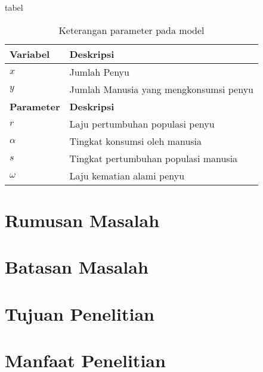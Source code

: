 tabel
\begin{longtable}{ll}
    \caption{Keterangan parameter pada model}                   \\
    \toprule
    \textbf{Variabel}  & \textbf{Deskripsi}                     \\
    \midrule
    $x$                & Jumlah Penyu                           \\
    $y$                & Jumlah Manusia yang mengkonsumsi penyu \\
    \midrule
    \textbf{Parameter} & \textbf{Deskripsi}                     \\
    \midrule
    $r$                & Laju pertumbuhan populasi penyu        \\
    $\alpha$           & Tingkat konsumsi oleh manusia          \\
    $s$                & Tingkat pertumbuhan populasi manusia   \\
    $\omega$           & Laju kematian alami penyu              \\
    \bottomrule
\end{longtable}

\section{Rumusan Masalah}
\section{Batasan Masalah}
\section{Tujuan Penelitian}
\section{Manfaat Penelitian}